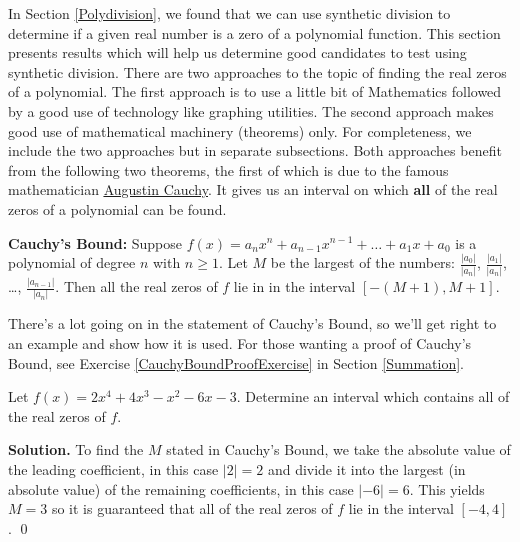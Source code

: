 \documentclass{ximera}
\begin{document}
	\author{Stitz-Zeager}




\setcounter{footnote}{0}

\label{RealZeros}

In Section \ref{Polydivision}, we found that we can use synthetic division to determine if a given real number is a zero of a polynomial function.  This section presents results which will help us determine good candidates to test using synthetic division.  There are two approaches to the topic of finding the real zeros of a polynomial.  The first approach  is to use a little bit of Mathematics followed by a good use of technology like graphing utilities.  The second approach  makes good use of mathematical machinery (theorems) only.  For completeness, we include the two approaches but in separate subsections. Both approaches benefit from the following two theorems, the first of which is due to the famous mathematician \href{http://en.wikipedia.org/wiki/Cauchy}{\underline{Augustin Cauchy}}.  It gives us an interval on which \textbf{all} of the real zeros of a polynomial can be found.

\smallskip


\begin{theorem} \label{CauchysBound}\textbf{Cauchy's Bound:}  Suppose $f(x) = a_{n} x^{n} + a_{n-1}x^{n-1} + \ldots + a_{1} x + a_0$ is a polynomial of degree $n$ with $n \geq 1$.  Let $M$ be the largest of the numbers: $\frac{|a_{0}|}{|a_{n}|}$, $\frac{|a_{1}|}{|a_{n}|}$, \ldots, $\frac{|a_{n-1}|}{|a_{n}|}$.  Then all the real zeros of $f$ lie in in the interval $[-(M+1),M+1]$.
\end{theorem}



There's a lot going on in the statement of Cauchy's Bound, so we'll get right to an example and show how it is used. For those wanting a proof of Cauchy's Bound, see Exercise \ref{CauchyBoundProofExercise} in Section \ref{Summation}.


\begin{example} \label{CBex} Let $f(x) = 2x^4+4x^3-x^2-6x-3$.  Determine an interval which contains all of the real zeros of $f$.

\smallskip

{\bf Solution.} To find the $M$ stated in Cauchy's Bound, we take the absolute value of the leading coefficient, in this case $|2| = 2$ and divide it into the largest (in absolute value) of the remaining coefficients, in this case $|-6| = 6$.   This yields $M=3$ so it is guaranteed that all of the real zeros of $f$ lie in the interval $[-4,4]$.  \qed

\end{example}
\end{document}
